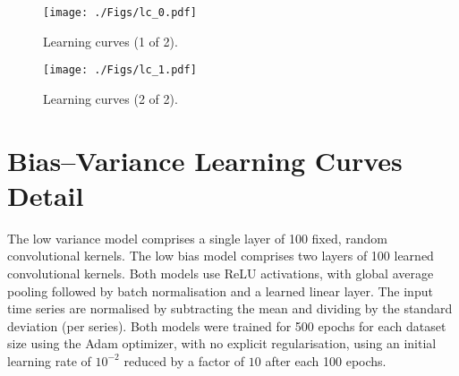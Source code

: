 \documentclass[twoside,11pt,preprint]{article}
\begin{document}
\begin{figure}[h]
    \centering
    \texttt{[image: ./Figs/lc\_0.pdf]}
    \caption{Learning curves (1 of 2).}%
\end{figure}%

\begin{figure}[h]%
    \centering%
    \texttt{[image: ./Figs/lc\_1.pdf]}%
    \caption{Learning curves (2 of 2).}%
\end{figure}%

\clearpage

\section{Bias--Variance Learning Curves Detail} \label{sec-appendix-bv}

The low variance model comprises a single layer of 100 fixed, random convolutional kernels. The low bias model comprises two layers of 100 learned convolutional kernels. Both models use ReLU activations, with global average pooling followed by batch normalisation and a learned linear layer. The input time series are normalised by subtracting the mean and dividing by the standard deviation (per series). Both models were trained for 500 epochs for each dataset size using the Adam optimizer, with no explicit regularisation, using an initial learning rate of $10^{-2}$ reduced by a factor of $10$ after each 100 epochs.
\end{document}
